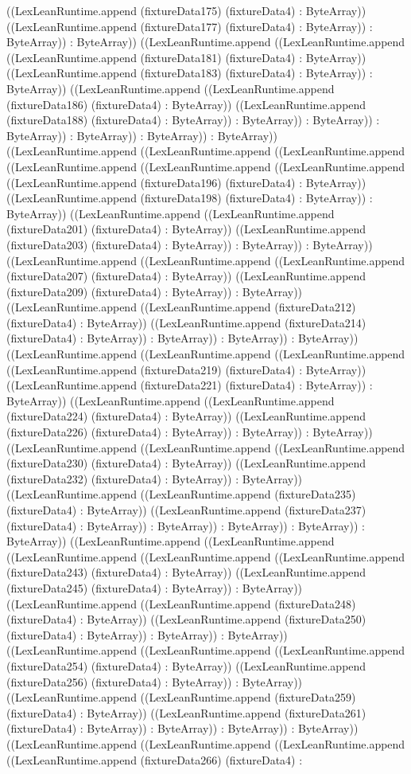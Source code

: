 \documentclass[11pt]{article}
\begin{document}
((LexLeanRuntime.append (fixtureData175) (fixtureData4) : ByteArray)) ((LexLeanRuntime.append (fixtureData177) (fixtureData4) : ByteArray)) : ByteArray)) : ByteArray)) ((LexLeanRuntime.append ((LexLeanRuntime.append ((LexLeanRuntime.append (fixtureData181) (fixtureData4) : ByteArray)) ((LexLeanRuntime.append (fixtureData183) (fixtureData4) : ByteArray)) : ByteArray)) ((LexLeanRuntime.append ((LexLeanRuntime.append (fixtureData186) (fixtureData4) : ByteArray)) ((LexLeanRuntime.append (fixtureData188) (fixtureData4) : ByteArray)) : ByteArray)) : ByteArray)) : ByteArray)) : ByteArray)) : ByteArray)) : ByteArray)) ((LexLeanRuntime.append ((LexLeanRuntime.append ((LexLeanRuntime.append ((LexLeanRuntime.append ((LexLeanRuntime.append ((LexLeanRuntime.append ((LexLeanRuntime.append (fixtureData196) (fixtureData4) : ByteArray)) ((LexLeanRuntime.append (fixtureData198) (fixtureData4) : ByteArray)) : ByteArray)) ((LexLeanRuntime.append ((LexLeanRuntime.append (fixtureData201) (fixtureData4) : ByteArray)) ((LexLeanRuntime.append (fixtureData203) (fixtureData4) : ByteArray)) : ByteArray)) : ByteArray)) ((LexLeanRuntime.append ((LexLeanRuntime.append ((LexLeanRuntime.append (fixtureData207) (fixtureData4) : ByteArray)) ((LexLeanRuntime.append (fixtureData209) (fixtureData4) : ByteArray)) : ByteArray)) ((LexLeanRuntime.append ((LexLeanRuntime.append (fixtureData212) (fixtureData4) : ByteArray)) ((LexLeanRuntime.append (fixtureData214) (fixtureData4) : ByteArray)) : ByteArray)) : ByteArray)) : ByteArray)) ((LexLeanRuntime.append ((LexLeanRuntime.append ((LexLeanRuntime.append ((LexLeanRuntime.append (fixtureData219) (fixtureData4) : ByteArray)) ((LexLeanRuntime.append (fixtureData221) (fixtureData4) : ByteArray)) : ByteArray)) ((LexLeanRuntime.append ((LexLeanRuntime.append (fixtureData224) (fixtureData4) : ByteArray)) ((LexLeanRuntime.append (fixtureData226) (fixtureData4) : ByteArray)) : ByteArray)) : ByteArray)) ((LexLeanRuntime.append ((LexLeanRuntime.append ((LexLeanRuntime.append (fixtureData230) (fixtureData4) : ByteArray)) ((LexLeanRuntime.append (fixtureData232) (fixtureData4) : ByteArray)) : ByteArray)) ((LexLeanRuntime.append ((LexLeanRuntime.append (fixtureData235) (fixtureData4) : ByteArray)) ((LexLeanRuntime.append (fixtureData237) (fixtureData4) : ByteArray)) : ByteArray)) : ByteArray)) : ByteArray)) : ByteArray)) ((LexLeanRuntime.append ((LexLeanRuntime.append ((LexLeanRuntime.append ((LexLeanRuntime.append ((LexLeanRuntime.append (fixtureData243) (fixtureData4) : ByteArray)) ((LexLeanRuntime.append (fixtureData245) (fixtureData4) : ByteArray)) : ByteArray)) ((LexLeanRuntime.append ((LexLeanRuntime.append (fixtureData248) (fixtureData4) : ByteArray)) ((LexLeanRuntime.append (fixtureData250) (fixtureData4) : ByteArray)) : ByteArray)) : ByteArray)) ((LexLeanRuntime.append ((LexLeanRuntime.append ((LexLeanRuntime.append (fixtureData254) (fixtureData4) : ByteArray)) ((LexLeanRuntime.append (fixtureData256) (fixtureData4) : ByteArray)) : ByteArray)) ((LexLeanRuntime.append ((LexLeanRuntime.append (fixtureData259) (fixtureData4) : ByteArray)) ((LexLeanRuntime.append (fixtureData261) (fixtureData4) : ByteArray)) : ByteArray)) : ByteArray)) : ByteArray)) ((LexLeanRuntime.append ((LexLeanRuntime.append ((LexLeanRuntime.append ((LexLeanRuntime.append (fixtureData266) (fixtureData4) : 
\end{document}
